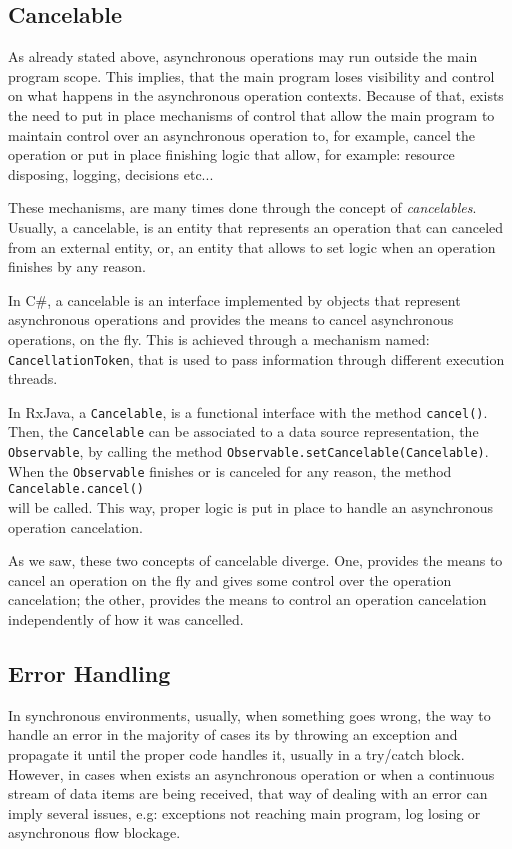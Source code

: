 	\subsection{Cancelable} 
	As already stated above, asynchronous operations may run outside the main program scope. 
	This implies, that the main program loses visibility and control on what happens in the asynchronous operation contexts.
	Because of that, exists the need to put in place mechanisms of control that allow the main program to maintain control over an asynchronous operation to, for example, cancel the operation or put in place finishing logic that allow, for example: resource disposing, logging, decisions etc...

	These mechanisms, are many times done through the concept of \textit{cancelables}. 
	Usually, a cancelable, is an entity that represents an operation that can canceled from an external entity, or, an entity that allows to set logic when an operation finishes by any reason.
 
	In C\#, a cancelable is an interface implemented by objects that represent asynchronous operations and provides the means to cancel asynchronous operations, on the fly. 
	This is achieved through a mechanism named: \texttt{CancellationToken}, that is used to pass information through different execution threads. 
	
	In RxJava, a \texttt{Cancelable}, is a functional interface with the method \texttt{cancel()}. Then, the \texttt{Cancelable} can be associated to a data source representation, the \texttt{Observable}, by calling the method \texttt{Observable.setCancelable(Cancelable)}. 
	When the \texttt{Observable} finishes or is canceled for any reason, the method \texttt{Cancelable.cancel()}\\ will be called. 
	This way,  proper logic is put in place to handle an asynchronous operation cancelation.
	
	As we saw, these two concepts of cancelable diverge. One, provides the means to cancel an operation on the fly and gives some control over the operation cancelation; the other, provides the means to control an operation cancelation independently of how it was cancelled.
	
	\clearpage
	\subsection{Error Handling}  
	In synchronous environments, usually, when something goes wrong, the way to handle an error in the majority of cases its by throwing an exception and propagate it until the proper code handles it, usually  in a try/catch block. 
	However, in cases when exists an asynchronous operation or when a continuous stream of data items are being received, that way of dealing with an error can imply several issues, e.g: exceptions not reaching main program, log losing or asynchronous flow blockage. 
	
